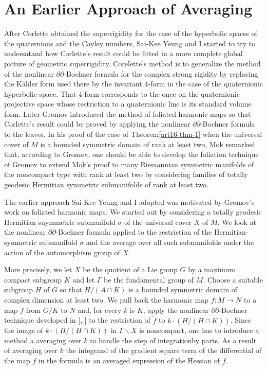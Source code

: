 \section*{An Earlier Approach of Averaging}
After Corlette \cite{art16-keyCo} obtained the superrigidity for the case of the hyperbolic spaces of the quaternions and the Cayley numbers, Sai-Kee Yeung and I started to try to undersatand how Corlette's result could be fitted in a more complete global picture of geometric superrigidity. Corelette's method is to generalize the method of the nonlinear $\partial\overline{\partial}$-Bochner formula for the complex strong rigidity by replacing the K\"ahler form used there by the invariant 4-form in the case of the quaternionic hyperbolic space. That 4-form corresponds to the once on the quaternionic projective space whose restriction to a quaternionic line is its standard volume form. Later Gromov \cite{art16-keyG} introduced the method of foliated harmonic maps so that Corlette's result could be proved by applying the nonlinear $\partial\overline{\partial}$-Bochner formula to the leaves. In his proof of the case of Theorem\ref{art16-thm-1} when the universal cover of $M$ is a bounded symmetric domain of rank at least two, Mok \cite{art16-keyMo} remarked that, according to Gromov, one should be able to develop the foliation technique of Gromov \cite{art16-keyG} to extend Mok's proof to many Riemannian symmetric manifolds of the noncompact type with rank at least two by considering families of totally geodesic Hermitian symmetric submanifolds of rank at least two.

The earlier approach Sai-Kee Yeung and I adopted was motivated by Gromov's work on foliated harmonic maps. We started out by considering a totally geodesic Hermitian suymmetric submanifold $\sigma$ of the universal cover $X$ of $M$. We look at the nonlinear $\partial\overline{\partial}$-Bochner formula applied to the restriction of the Hermitian-symmetric submanifold $\sigma$ and the average over all such submanifolds under the action of the automorphism group of $X$.

More precisely, we let $X$ be the quotient of a Lie group $G$ by a maximum compact subgroup $K$ and let $\Gamma$ be the fundamental group of $M$. Choose a suitable subgroup $H$ of $G$ so that $H/(A\cap K)$ is a bounded symmetric domain of complex dimension at least two. We pull back the harmonic map $f: M \rightarrow N$ to a map $\tilde{f}$ from $G/K$ to $N$ and, for every $k$ is $K$, apply the nonlinear $\partial\overline{\partial}$-Bochner technique developed in [\cite{art16-keySi}, \cite{art16-keySa}] to the restriction of $\tilde{f}$ to $k \cdot(H/(H \cap K))$. Since the image of $k\cdot (H /(H \cap K))$ in $\Gamma\backslash X$ is noncompact, one has to introduce a method a averaging over $k$ to handle the step of integration\pageoriginale by parts. As a result of averaging over $k$ the integrand of the gradient square term of the differential of the map $f$ in the formula is an averaged expression of the Hessian of $f$.

